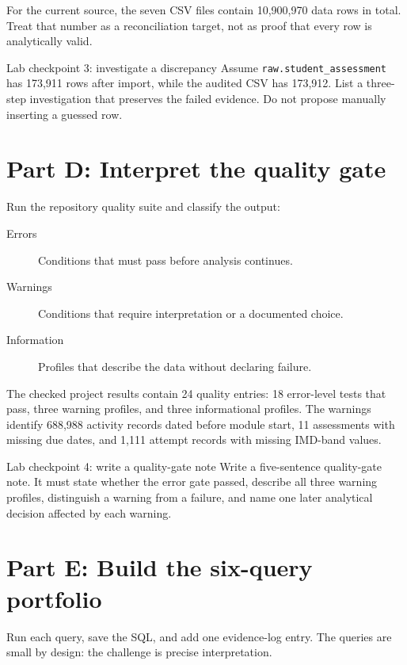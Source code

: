For the current source, the seven CSV files contain 10,900,970 data rows in
total. Treat that number as a reconciliation target, not as proof that every
row is analytically valid.

\begin{exercisebox}{Lab checkpoint 3: investigate a discrepancy}
\label{ex:lab-reconcile}
Assume \texttt{raw.student\_assessment} has 173,911 rows after import, while the
audited CSV has 173,912. List a three-step investigation that preserves the
failed evidence. Do not propose manually inserting a guessed row.
\end{exercisebox}

\section{Part D: Interpret the quality gate}

Run the repository quality suite and classify the output:
\begin{description}
  \item[Errors] Conditions that must pass before analysis continues.
  \item[Warnings] Conditions that require interpretation or a documented choice.
  \item[Information] Profiles that describe the data without declaring failure.
\end{description}

The checked project results contain 24 quality entries: 18 error-level tests
that pass, three warning profiles, and three informational profiles. The
warnings identify 688,988 activity records dated before module start, 11
assessments with missing due dates, and 1,111 attempt records with missing
IMD-band values.

\begin{exercisebox}{Lab checkpoint 4: write a quality-gate note}
\label{ex:lab-quality}
Write a five-sentence quality-gate note. It must state whether the error gate
passed, describe all three warning profiles, distinguish a warning from a
failure, and name one later analytical decision affected by each warning.
\end{exercisebox}

\section{Part E: Build the six-query portfolio}

Run each query, save the SQL, and add one evidence-log entry. The queries are
small by design: the challenge is precise interpretation.

